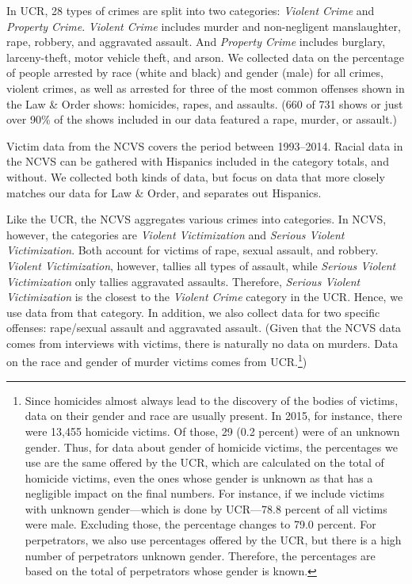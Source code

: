 \documentclass[12pt, letterpaper]{article}
\begin{document}
In UCR, 28 types of crimes are split into two categories: \textit{Violent Crime} and \textit{Property Crime}. \textit{Violent Crime} includes murder and non-negligent manslaughter, rape, robbery, and aggravated assault. And \textit{Property Crime} includes burglary, larceny-theft, motor vehicle theft, and arson. We collected data on the percentage of people arrested by race (white and black) and gender (male) for all crimes, violent crimes, as well as arrested for three of the most common offenses shown in the Law \& Order shows: homicides, rapes, and assaults. (660 of 731 shows or just over 90\% of the shows included in our data featured a rape, murder, or assault.)

Victim data from the NCVS covers the period between 1993--2014. Racial data in the NCVS can be gathered with Hispanics included in the category totals, and without. We collected both kinds of data, but focus on data that more closely matches our data for Law \& Order, and separates out Hispanics.

Like the UCR, the NCVS aggregates various crimes into categories. In NCVS, however, the categories are \textit{Violent Victimization} and \textit{Serious Violent Victimization}. Both account for victims of rape, sexual assault, and robbery. \textit{Violent Victimization}, however, tallies all types of assault, while \textit{Serious Violent Victimization} only tallies aggravated assaults. Therefore, \textit{Serious Violent Victimization} is the closest to the \textit{Violent Crime} category in the UCR. Hence, we use data from that category. In addition, we also collect data for two specific offenses: rape/sexual assault and aggravated assault. (Given that the NCVS data comes from interviews with victims, there is naturally no data on murders. Data on the race and gender of murder victims comes from UCR.\footnote{Since homicides almost always lead to the discovery of the bodies of victims, data on their gender and race are usually present. In 2015, for instance, there were 13,455 homicide victims. Of those, 29 (0.2 percent) were of an unknown gender. Thus, for data about gender of homicide victims, the percentages we use are the same offered by the UCR, which are calculated on the total of homicide victims, even the ones whose gender is unknown as that has a negligible impact on the final numbers. For instance, if we include victims with unknown gender---which is done by UCR---78.8 percent of all victims were male. Excluding those, the percentage changes to 79.0 percent. For perpetrators, we also use percentages offered by the UCR, but there is a high number of perpetrators unknown gender. Therefore, the percentages are based on the total of perpetrators whose gender is known.})
\end{document}
